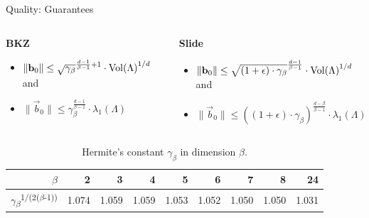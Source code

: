 \documentclass[xcolor=table,10pt,aspectratio=169]{beamer}
\begin{document}
\begin{frame}[label={sec:org3b62c30}]{Quality: Guarantees}
\begin{columns}[t]
\begin{column}{0.50\columnwidth}
\textbf{BKZ}

\begin{itemize}
\item \(\|\mathbf{b}_{0}\| \leq \sqrt{\gamma_{\beta}}^{\frac{d-1}{\beta-1} + 1} \cdot {\operatorname{Vol}(\Lambda)}^{1/d}\) and
\item \(\|\vec b_{0}\| \leq \gamma_{\beta}^{\frac{d-1}{\beta-1}} \cdot \lambda_{1}(\Lambda)\)
\end{itemize}
\end{column}

\begin{column}{0.50\columnwidth}
\textbf{Slide}

\begin{itemize}
\item \(\|\mathbf{b}_{0}\| \leq \sqrt{(1+\epsilon)\cdot \gamma_{\beta}}^{\frac{d-1}{\beta-1}} \cdot {\operatorname{Vol}(\Lambda)}^{1/d}\) and

\item \(\|\vec b_{0}\| \leq {\left((1+\epsilon)\cdot \gamma_{\beta}\right)}^{\frac{d-\beta}{\beta-1}} \cdot \lambda_{1}(\Lambda)\)
\end{itemize}
\end{column}
\end{columns}

\begin{table}[htbp]
\centering
\begin{tabular}{rrrrrrrrr}
\(\beta\) & 2 & 3 & 4 & 5 & 6 & 7 & 8 & 24\\
\hline
\(\gamma\)\textsubscript{\(\beta\)}\textsuperscript{1/(2(\(\beta\)-1))} & 1.074 & 1.059 & 1.059 & 1.053 & 1.052 & 1.050 & 1.050 & 1.031\\
\end{tabular}
\caption{Hermite’s constant \(\gamma_{\beta}\) in dimension \(\beta\).}

\end{table}

\scriptsize


\end{frame}
\end{document}
